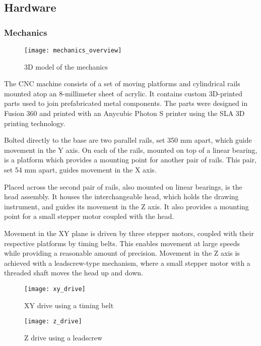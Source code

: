 \clearpage
\subsection{Hardware}

\subsubsection{Mechanics}

\begin{figure}[ht]
    \begin{center}
        \texttt{[image: mechanics\_overview]}
        \caption{3D model of the mechanics}
    \end{center}
\end{figure}

The CNC machine consists of a set of moving platforms and cylindrical rails
mounted atop an 8-millimeter sheet of acrylic. It contains custom 3D-printed
parts used to join prefabricated metal components. The parts were designed in
Fusion 360 and printed with an Anycubic Photon S printer using the SLA 3D
printing technology.

Bolted directly to the base are two parallel rails, set 350 mm apart, which
guide movement in the Y axis. On each of the rails, mounted on top of a linear
bearing, is a platform which provides a mounting point for another pair of
rails. This pair, set 54 mm apart, guides movement in the X axis.

Placed across the second pair of rails, also mounted on linear bearings, is the
head assembly. It houses the interchangeable head, which holds the drawing
instrument, and guides its movement in the Z axis. It also provides a mounting
point for a small stepper motor coupled with the head.

Movement in the XY plane is driven by three stepper motors, coupled with their
respective platforms by timing belts. This enables movement at large speeds
while providing a reasonable amount of precision. Movement in the Z axis is
achieved with a leadscrew-type mechanism, where a small stepper motor with a
threaded shaft moves the head up and down.

\begin{figure}[ht]
    \centering
    \begin{minipage}{0.5\textwidth}
        \centering
        \texttt{[image: xy\_drive]}
        \caption{XY drive using a timing belt}
    \end{minipage}\hfill
    \begin{minipage}{0.5\textwidth}
        \centering
        \texttt{[image: z\_drive]}
        \caption{Z drive using a leadscrew}
    \end{minipage}
\end{figure}

